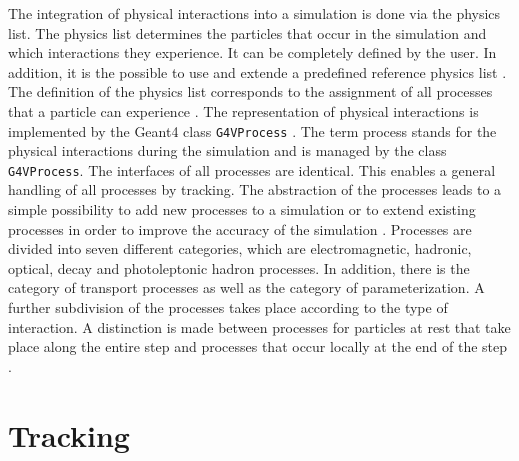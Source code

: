 \documentclass[12pt, a4paper]{thesis}
\begin{document}
The integration of physical interactions into a simulation is done via
the physics list. The physics list determines the particles that occur
in the simulation and which interactions they experience. It can be
completely defined by the user. In addition, it is the possible to use
and extende a predefined reference physics list
\cite{geant4-rec-dev}. The definition of the physics list corresponds
to the assignment of all processes that a particle can experience
\cite{geant_simul_toolk}. The representation of physical interactions
is implemented by the Geant4 class \texttt{G4VProcess}
\cite{geant_simul_toolk}. The term process stands for the physical
interactions during the simulation and is managed by the class
\texttt{G4VProcess}. The interfaces of all processes are
identical. This enables a general handling of all processes by
tracking. The abstraction of the processes leads to a simple
possibility to add new processes to a simulation or to extend existing
processes in order to improve the accuracy of the simulation
\cite{geant4-doc}. Processes are divided into seven different
categories, which are electromagnetic, hadronic, optical, decay and
photoleptonic hadron processes. In addition, there is the category of
transport processes as well as the category of parameterization. A
further subdivision of the processes takes place according to the type
of interaction. A distinction is made between processes for particles
at rest that take place along the entire step and processes that occur
locally at the end of the step \cite{geant_simul_toolk}.

\section{Tracking}
\label{sec:org2ff4601}
\end{document}
